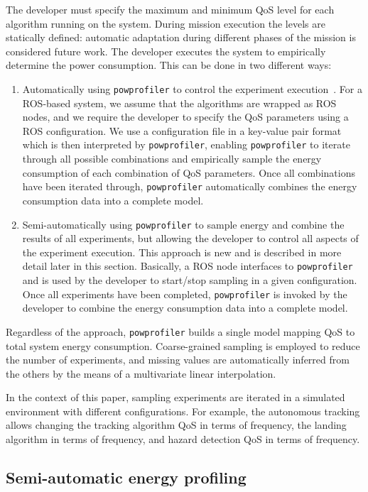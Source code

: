 \documentclass[conference]{IEEEtran}
\newcommand{\stt}[1]{{\small\tt #1}} %
\newcommand{\powprof}{\stt{powprofiler}}
\begin{document}
The developer must specify the maximum and minimum QoS level for
each algorithm running on the system.  During mission execution the
levels are statically defined: automatic adaptation during different
phases of the mission is 
considered future work.
%
The developer executes the system to empirically determine the
power consumption. This can be done in two different ways:
%
\begin{enumerate}
\item Automatically using \powprof{} to control the experiment
  execution~\cite{seewald2019coarse}. For a ROS-based system, we assume that the algorithms
  are wrapped as ROS nodes, and we require the developer to specify
  the QoS parameters using a ROS configuration. We use a configuration
  file in a key-value pair format which is then interpreted by
  \powprof{}, enabling \powprof{} to iterate through all possible
  combinations and empirically sample the energy consumption of each
  combination of QoS parameters. Once all combinations have been
  iterated through, \powprof{} automatically combines the energy
  consumption data into a complete model.
\item Semi-automatically using \powprof{} to sample energy and combine
  the results of all experiments, but allowing the developer to
  control all aspects of the experiment execution. This approach is new and is described in more detail later in this
  section. Basically, a ROS node interfaces to \powprof{} and is used
  by the developer to start/stop sampling in a given
  configuration. Once all experiments have been completed, \powprof{} is
  invoked by the developer to combine the energy consumption data into
  a complete model.

\end{enumerate}
%
Regardless of the approach, \powprof{} builds a single model mapping
QoS to total system energy consumption. Coarse-grained sampling is
employed to reduce the number of experiments, and missing values are
automatically inferred from the others by the means of a multivariate
linear interpolation.

In the context of this paper, sampling experiments are iterated in a
simulated environment with different configurations.  For example, the
autonomous tracking allows changing the tracking algorithm QoS in
terms of frequency, the landing algorithm in terms of frequency, and
hazard detection QoS in terms of frequency.
%


\subsection{Semi-automatic energy profiling}
\label{sec:semi-automatic}
\end{document}
